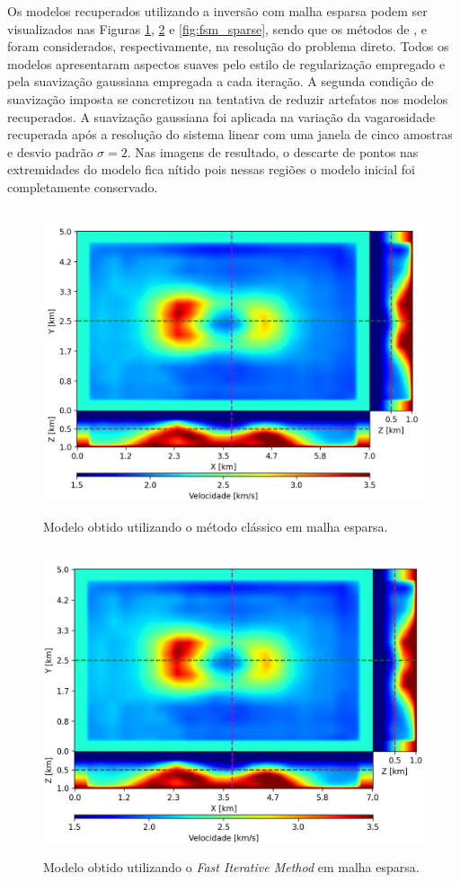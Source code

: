 Os modelos recuperados utilizando a inversão com malha esparsa podem ser visualizados nas Figuras \ref{fig:pod_sparse}, \ref{fig:fim_sparse} e \ref{fig:fsm_sparse}, sendo que os métodos de ,  e  foram considerados, respectivamente, na resolução do problema direto. Todos os modelos apresentaram aspectos suaves pelo estilo de regularização empregado e pela suavização gaussiana empregada a cada iteração. A segunda condição de suavização imposta se concretizou na tentativa de reduzir artefatos nos modelos recuperados. A suavização gaussiana foi aplicada na variação da vagarosidade recuperada após a resolução do sistema linear com uma janela de cinco amostras e desvio padrão $\sigma = 2$. Nas imagens de resultado, o descarte de pontos nas extremidades do modelo fica nítido pois nessas regiões o modelo inicial foi completamente conservado.

\begin{figure}[H]
	\centering
	\includegraphics[width=12cm,height=9cm]{Imgs/Resultados/pod_sparse.png}
	\caption{Modelo obtido utilizando o método clássico em malha esparsa.}
	\label{fig:pod_sparse}	
\end{figure}

\begin{figure}[H]
	\centering
	\includegraphics[width=12cm,height=9cm]{Imgs/Resultados/fim_sparse.png}
	\caption{Modelo obtido utilizando o \textit{Fast Iterative Method} em malha esparsa.}
	\label{fig:fim_sparse}	
\end{figure}

